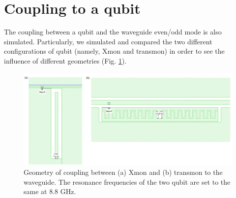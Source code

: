 \documentclass[noshowpacs,amsmath,
superscriptaddress,
10pt]{article}
\begin{document}

\section{Coupling to a qubit}

The coupling between a qubit and the waveguide even/odd mode is also simulated. Particularly, we simulated and compared the  two different configurations of qubit (namely, Xmon and transmon) in order to see the influence of different geometries (Fig. \ref{pic:Lo_Xtransmon}).

 \begin{figure}[!ht]
\centering
\includegraphics[width=16cm] {Lo_Xtransmon}
\caption{Geometry of coupling between (a) Xmon and (b) transmon to the waveguide. The resonance frequencies of the two qubit are set to the same at 8.8 GHz.}
\label{pic:Lo_Xtransmon}
\end{figure}
\end{document}
